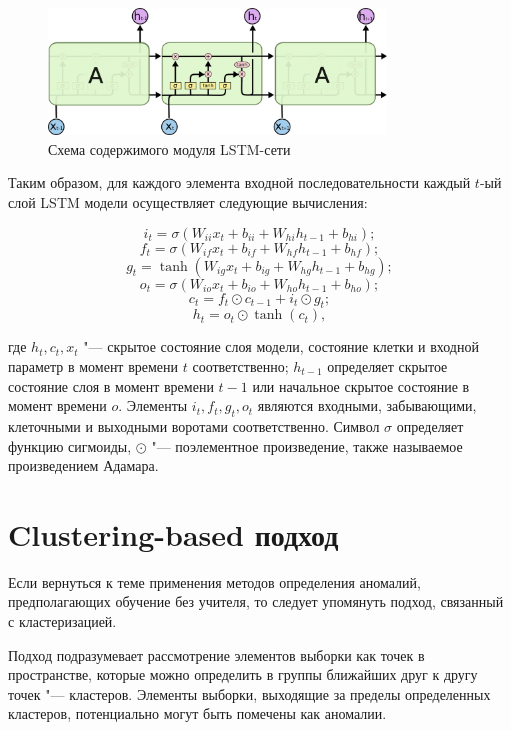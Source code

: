 \documentclass[bachelor, och, referat]{../shiza}
\begin{document}
            \begin{figure}[H]
                \centering
                \includegraphics[width=0.8\textwidth]{pic/lstm.png}
                \caption{Схема содержимого модуля LSTM-сети}
            \end{figure}

            Таким образом, для каждого элемента входной последовательности
            каждый $t$-ый слой LSTM модели осуществляет следующие вычисления:
    
            \[i_t = \sigma(W_{ii} x_t + b_{ii} + W_{hi} h_{t - 1} + b_{hi}) ;\]
            \[f_t = \sigma(W_{if} x_t + b_{if} + W_{hf} h_{t - 1} + b_{hf}) ;\]
            \[g_t = \tanh(W_{ig} x_t + b_{ig} + W_{hg} h_{t - 1} + b_{hg}) ;\]
            \[o_t = \sigma(W_{io} x_t + b_{io} + W_{ho} h_{t - 1} + b_{ho}) ;\]
            \[c_t = f_t \odot c_{t - 1} + i_t \odot g_t ;\]
            \[h_t = o_t \odot \tanh(c_t) ,\]
    
            где $h_t, c_t, x_t$ "--- скрытое состояние слоя модели, состояние
            клетки и входной параметр в момент времени $t$ соответственно; $h_{t
            - 1}$ определяет скрытое состояние слоя в момент времени $t - 1$ или
            начальное скрытое состояние в момент времени $o$. Элементы $i_t,
            f_t, g_t, o_t$ являются входными, забывающими, клеточными и
            выходными воротами соответственно. Символ $\sigma$ определяет
            функцию сигмоиды, $\odot$ "--- поэлементное произведение, также
            называемое произведением Адамара.

\section{Clustering-based подход}
    
        Если вернуться к теме применения методов определения аномалий,
        предполагающих обучение без учителя, то следует упомянуть подход,
        связанный с кластеризацией.

        Подход подразумевает рассмотрение элементов выборки как точек в
        пространстве, которые можно определить в группы ближайших друг к другу
        точек "--- кластеров. Элементы выборки, выходящие за пределы
        определенных кластеров, потенциально могут быть помечены как аномалии.
        
\end{document}

